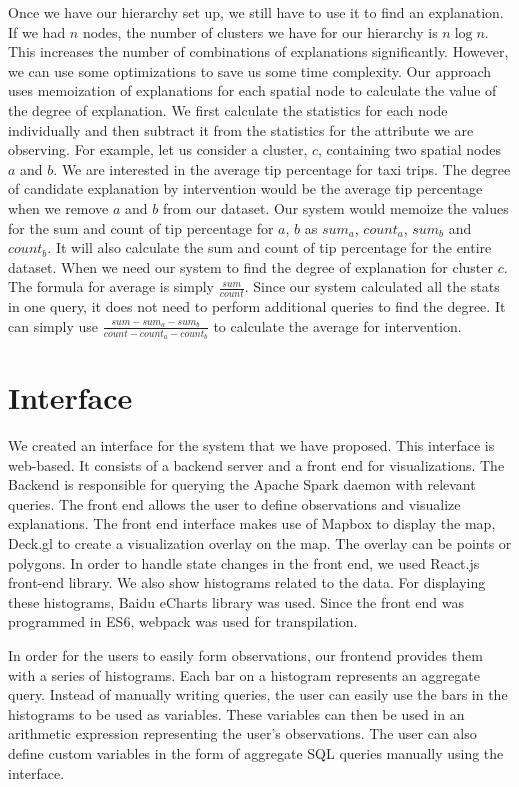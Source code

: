 Once we have our hierarchy set up, we still have to use it to find an explanation. If we had $n$ nodes, the number of clusters we have for our hierarchy is $n \log n$.  This increases the number of combinations of explanations significantly. However, we can use some optimizations to save us some time complexity. Our approach uses memoization of explanations for each spatial node to calculate the value of the degree of explanation. We first calculate the statistics for each node individually and then subtract it from the statistics for the attribute we are observing. For example, let us consider a cluster, $c$, containing two spatial nodes $a$ and $b$. We are interested in the average tip percentage for taxi trips. The degree of candidate explanation by intervention would be the average tip percentage when we remove $a$ and $b$ from our dataset. Our system would memoize the values for the sum and count of tip percentage for $a$, $b$ as $sum_a$, $count_a$, $sum_b$ and $count_b$. It will also calculate the sum and count of tip percentage for the entire dataset. When we need our system to find the degree of explanation for cluster $c$. The formula for average is simply $\frac{sum}{count}$. Since our system calculated all the stats in one query, it does not need to perform additional queries to find the degree. It can simply use $\frac{sum-sum_a-sum_b}{count-count_a-count_b}$ to calculate the average for intervention.

\section{Interface}
We created an interface for the system that we have proposed. This interface is web-based. It consists of a backend server and a front end for visualizations. The Backend is responsible for querying the Apache Spark daemon with relevant queries. The front end allows the user to define observations and visualize explanations. The front end interface makes use of Mapbox to display the map, Deck.gl to create a visualization overlay on the map. The overlay can be points or polygons. In order to handle state changes in the front end, we used React.js front-end library. We also show histograms related to the data. For displaying these histograms, Baidu eCharts library was used. Since the front end was programmed in ES6, webpack was used for transpilation.

In order for the users to easily form observations, our frontend provides them with a series of histograms. Each bar on a histogram represents an aggregate query. Instead of manually writing queries, the user can easily use the bars in the histograms to be used as variables. These variables can then be used in an arithmetic expression representing the user's observations. The user can also define custom variables in the form of aggregate SQL queries manually using the interface.

